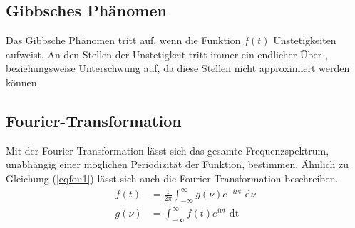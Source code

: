 \subsection{Gibbsches Phänomen}
Das Gibbsche Phänomen tritt auf, wenn die Funktion $f(t)$ Unstetigkeiten aufweist. An den Stellen
der Unstetigkeit tritt immer ein endlicher Über-, beziehungsweise Unterschwung auf, da diese Stellen
nicht approximiert werden können.
\subsection{Fourier-Transformation}
Mit der Fourier-Transformation lässt sich das gesamte Frequenzspektrum, unabhängig einer
möglichen Periodizität der Funktion, bestimmen. Ähnlich zu Gleichung (\ref{eqfou1}) lässt sich auch die 
Fourier-Transformation beschreiben.
\begin{align}
f(t)&=\frac{1}{2 \pi} \int_{-\infty}^{\infty} g(\nu) e^{-i \nu t} \text{ d}\nu \\
g(\nu)&=\int_{-\infty}^{\infty} f(t) e^{i \nu t} \text{ dt} \label{eqfout2}
\end{align}
